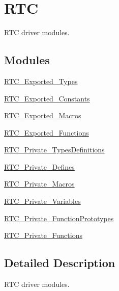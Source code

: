 \hypertarget{group___r_t_c}{}\section{R\+TC}
\label{group___r_t_c}


R\+TC driver modules.  


\subsection*{Modules}
\begin{DoxyCompactItemize}
\item 
\mbox{\hyperlink{group___r_t_c___exported___types}{R\+T\+C\+\_\+\+Exported\+\_\+\+Types}}
\item 
\mbox{\hyperlink{group___r_t_c___exported___constants}{R\+T\+C\+\_\+\+Exported\+\_\+\+Constants}}
\item 
\mbox{\hyperlink{group___r_t_c___exported___macros}{R\+T\+C\+\_\+\+Exported\+\_\+\+Macros}}
\item 
\mbox{\hyperlink{group___r_t_c___exported___functions}{R\+T\+C\+\_\+\+Exported\+\_\+\+Functions}}
\item 
\mbox{\hyperlink{group___r_t_c___private___types_definitions}{R\+T\+C\+\_\+\+Private\+\_\+\+Types\+Definitions}}
\item 
\mbox{\hyperlink{group___r_t_c___private___defines}{R\+T\+C\+\_\+\+Private\+\_\+\+Defines}}
\item 
\mbox{\hyperlink{group___r_t_c___private___macros}{R\+T\+C\+\_\+\+Private\+\_\+\+Macros}}
\item 
\mbox{\hyperlink{group___r_t_c___private___variables}{R\+T\+C\+\_\+\+Private\+\_\+\+Variables}}
\item 
\mbox{\hyperlink{group___r_t_c___private___function_prototypes}{R\+T\+C\+\_\+\+Private\+\_\+\+Function\+Prototypes}}
\item 
\mbox{\hyperlink{group___r_t_c___private___functions}{R\+T\+C\+\_\+\+Private\+\_\+\+Functions}}
\end{DoxyCompactItemize}


\subsection{Detailed Description}
R\+TC driver modules. 

